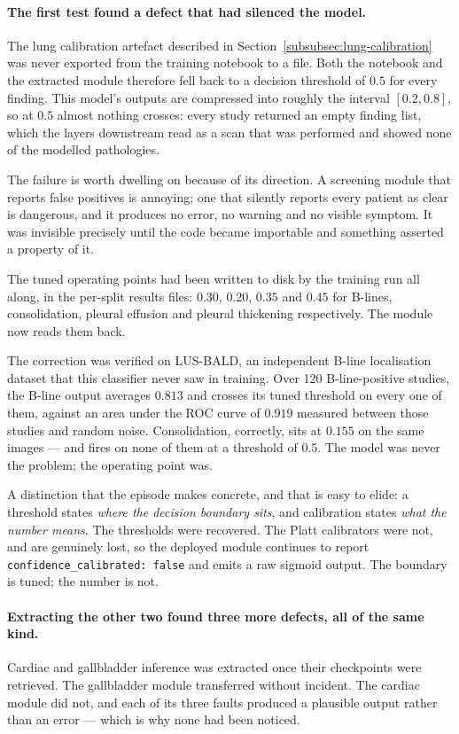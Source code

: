 \paragraph{The first test found a defect that had silenced the model.} The lung calibration
artefact described in Section~\ref{subsubsec:lung-calibration} was never exported from the
training notebook to a file. Both the notebook and the extracted module therefore fell back to
a decision threshold of $0.5$ for every finding. This model's outputs are compressed into
roughly the interval $[0.2, 0.8]$, so at $0.5$ almost nothing crosses: every study returned an
empty finding list, which the layers downstream read as a scan that was performed and showed
none of the modelled pathologies.

The failure is worth dwelling on because of its direction. A screening module that reports
false positives is annoying; one that silently reports every patient as clear is dangerous, and
it produces no error, no warning and no visible symptom. It was invisible precisely until the
code became importable and something asserted a property of it.

The tuned operating points had been written to disk by the training run all along, in the
per-split results files: $0.30$, $0.20$, $0.35$ and $0.45$ for B-lines, consolidation, pleural
effusion and pleural thickening respectively. The module now reads them back.

The correction was verified on LUS-BALD, an independent B-line localisation dataset that this
classifier never saw in training. Over 120 B-line-positive studies, the B-line output averages
$0.813$ and crosses its tuned threshold on every one of them, against an area under the ROC
curve of $0.919$ measured between those studies and random noise. Consolidation, correctly, sits
at $0.155$ on the same images --- and fires on none of them at a threshold of $0.5$. The model
was never the problem; the operating point was.

A distinction that the episode makes concrete, and that is easy to elide: a threshold states
\emph{where the decision boundary sits}, and calibration states \emph{what the number means}.
The thresholds were recovered. The Platt calibrators were not, and are genuinely lost, so the
deployed module continues to report \texttt{confidence\_calibrated: false} and emits a raw
sigmoid output. The boundary is tuned; the number is not.

\paragraph{Extracting the other two found three more defects, all of the same kind.} Cardiac and
gallbladder inference was extracted once their checkpoints were retrieved. The gallbladder
module transferred without incident. The cardiac module did not, and each of its three faults
produced a plausible output rather than an error --- which is why none had been noticed.

